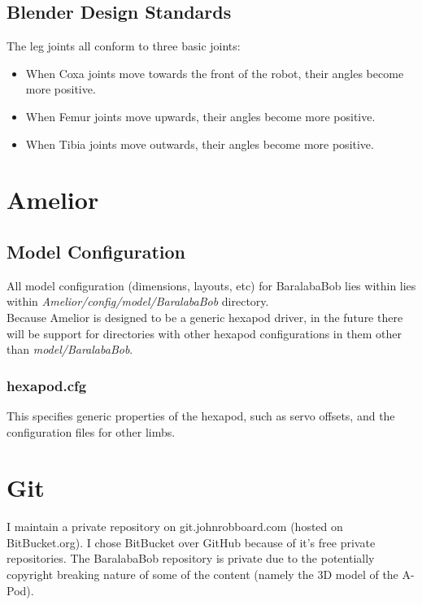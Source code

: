 			\subsection{Blender Design Standards}
				The leg joints all conform to three basic joints:
			
				\begin{itemize}
					\item When Coxa joints move towards the front 		of the robot, their angles become more 				positive.
					\item When Femur joints move upwards, their 		angles become more positive.
					\item When Tibia joints move outwards, their 		angles become more positive.
				\end{itemize}
				\pagebreak


		\section{Amelior}
			\subsection{Model Configuration}
				All model configuration (dimensions, layouts, etc) for BaralabaBob lies within  lies within \textit{Amelior/config/model/BaralabaBob} directory.\\
				
				Because Amelior is designed to be a generic hexapod driver, in the future there will be support for directories with other hexapod configurations in them other than \textit{model/BaralabaBob}.
		
				\subsubsection{hexapod.cfg}
					This specifies generic properties of the hexapod, such as servo offsets, and the configuration files for other limbs.
					\pagebreak
					\section{Git}
						\label{Git}
						\label{Repository}
					I maintain a private repository on git.johnrobboard.com (hosted on BitBucket.org). I chose BitBucket over GitHub because of it's free private repositories. The BaralabaBob repository is private due to the potentially copyright breaking nature of some of the content (namely the 3D model of the A-Pod).
			
